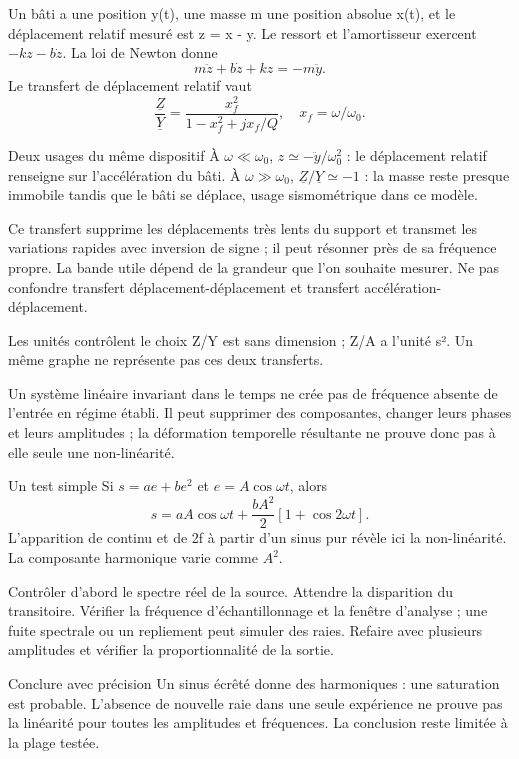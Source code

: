Un bâti a une position y(t), une masse m une position absolue x(t), et le déplacement relatif mesuré est z = x - y. Le ressort et l’amortisseur exercent $-kz-b\dot z$. La loi de Newton donne\[m\ddot z+b\dot z+kz=-m\ddot y.\]Le transfert de déplacement relatif vaut\[\frac{\underline Z}{\underline Y}=\frac{x_f^2}{1-x_f^2+jx_f/Q},\quad x_f=\omega/\omega_0.\]
\begin{loi}{Deux usages du même dispositif}
À $\omega\ll\omega_0$, $z\simeq-\ddot y/\omega_0^2$ : le déplacement relatif renseigne sur l’accélération du bâti. À $\omega\gg\omega_0$, $\underline Z/\underline Y\simeq-1$ : la masse reste presque immobile tandis que le bâti se déplace, usage sismométrique dans ce modèle.
\end{loi}
Ce transfert supprime les déplacements très lents du support et transmet les variations rapides avec inversion de signe ; il peut résonner près de sa fréquence propre. La bande utile dépend de la grandeur que l’on souhaite mesurer. Ne pas confondre transfert déplacement-déplacement et transfert accélération-déplacement.
\begin{piege}{Les unités contrôlent le choix}
Z/Y est sans dimension ; Z/A a l’unité s². Un même graphe ne représente pas ces deux transferts.
\end{piege}


Un système linéaire invariant dans le temps ne crée pas de fréquence absente de l’entrée en régime établi. Il peut supprimer des composantes, changer leurs phases et leurs amplitudes ; la déformation temporelle résultante ne prouve donc pas à elle seule une non-linéarité.
\begin{loi}{Un test simple}
Si $s=ae+be^2$ et $e=A\cos\omega t$, alors\[s=aA\cos\omega t+\frac{bA^2}{2}[1+\cos2\omega t].\]L’apparition de continu et de 2f à partir d’un sinus pur révèle ici la non-linéarité. La composante harmonique varie comme $A^2$.
\end{loi}
Contrôler d’abord le spectre réel de la source. Attendre la disparition du transitoire. Vérifier la fréquence d’échantillonnage et la fenêtre d’analyse ; une fuite spectrale ou un repliement peut simuler des raies. Refaire avec plusieurs amplitudes et vérifier la proportionnalité de la sortie.
\begin{methode}{Conclure avec précision}
Un sinus écrêté donne des harmoniques : une saturation est probable. L’absence de nouvelle raie dans une seule expérience ne prouve pas la linéarité pour toutes les amplitudes et fréquences. La conclusion reste limitée à la plage testée.
\end{methode}


